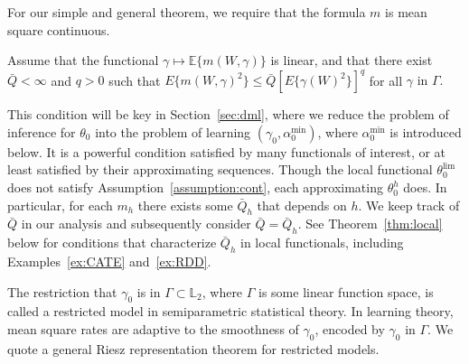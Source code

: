 For our simple and general theorem, we require that the formula $m$ is mean square continuous.
\begin{assumption}\label{assumption:cont}
Assume that the functional $\gamma\mapsto \mathbb{E}\{m(W,\gamma)\}$ is linear, and that there exist $\bar{Q}<\infty $ and $q>0$ such that
$
E\{m(W,\gamma)^2\}\leq \bar{Q} [E\{\gamma(W)^2\}]^q$ for all $\gamma\text{ in } \Gamma.
$
\end{assumption}
This condition will be key in Section~\ref{sec:dml}, where we reduce the problem of inference for $\theta_0$ into the problem of learning $(\gamma_0,\alpha^{\min}_0)$, where $\alpha^{\min}_0$ is introduced below. It is a powerful condition satisfied by many functionals of interest, or at least satisfied by their approximating sequences. Though the local functional $\theta_0^{\lim}$ does not satisfy Assumption~\ref{assumption:cont}, each approximating $\theta_0^h$ does. In particular, for each $m_h$ there exists some $\bar{Q}_h$ that depends on $h$. We keep track of $\bar{Q}$ in our analysis and subsequently consider $\bar{Q}=\bar{Q}_h$. See Theorem~\ref{thm:local} below for conditions that characterize $\bar{Q}_h$ in local functionals, including Examples~\ref{ex:CATE} and~\ref{ex:RDD}.

The restriction that $\gamma_0$ is in $\Gamma\subset \mathbb{L}_2$, where $\Gamma$ is some linear function space, is called a restricted model in semiparametric statistical theory. In learning theory, mean square rates are adaptive to the smoothness of $\gamma_0$, encoded by $\gamma_0\text{ in }\Gamma$. We quote a general Riesz representation theorem for restricted models.

